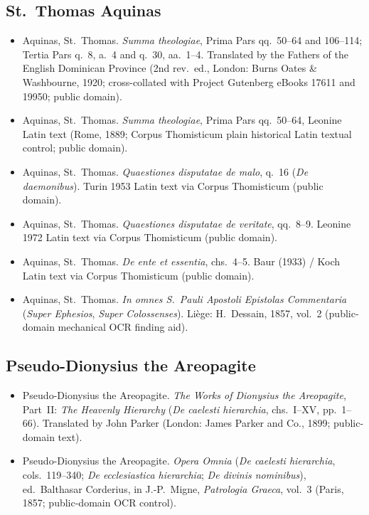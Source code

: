 \subsection{St.~Thomas Aquinas}
\begin{itemize}
\item Aquinas, St.~Thomas. \emph{Summa theologiae}, Prima Pars qq.~50--64 and 106--114; Tertia Pars q.~8, a.~4 and q.~30, aa.~1--4. Translated by the Fathers of the English Dominican Province (2nd rev.\ ed., London: Burns Oates \& Washbourne, 1920; cross-collated with Project Gutenberg eBooks 17611 and 19950; public domain).
\item Aquinas, St.~Thomas. \emph{Summa theologiae}, Prima Pars qq.~50--64, Leonine Latin text (Rome, 1889; Corpus Thomisticum plain historical Latin textual control; public domain).
\item Aquinas, St.~Thomas. \emph{Quaestiones disputatae de malo}, q.~16 (\emph{De daemonibus}). Turin 1953 Latin text via Corpus Thomisticum (public domain).
\item Aquinas, St.~Thomas. \emph{Quaestiones disputatae de veritate}, qq.~8--9. Leonine 1972 Latin text via Corpus Thomisticum (public domain).
\item Aquinas, St.~Thomas. \emph{De ente et essentia}, chs.~4--5. Baur (1933) / Koch Latin text via Corpus Thomisticum (public domain).
\item Aquinas, St.~Thomas. \emph{In omnes S.~Pauli Apostoli Epistolas Commentaria} (\emph{Super Ephesios}, \emph{Super Colossenses}). Li\`ege: H.~Dessain, 1857, vol.~2 (public-domain mechanical OCR finding aid).
\end{itemize}

\subsection{Pseudo-Dionysius the Areopagite}
\begin{itemize}
\item Pseudo-Dionysius the Areopagite. \emph{The Works of Dionysius the Areopagite}, Part~II: \emph{The Heavenly Hierarchy} (\emph{De caelesti hierarchia}, chs.~I--XV, pp.~1--66). Translated by John Parker (London: James Parker and Co., 1899; public-domain text).
\item Pseudo-Dionysius the Areopagite. \emph{Opera Omnia} (\emph{De caelesti hierarchia}, cols.~119--340; \emph{De ecclesiastica hierarchia}; \emph{De divinis nominibus}), ed.\ Balthasar Corderius, in J.-P.~Migne, \emph{Patrologia Graeca}, vol.~3 (Paris, 1857; public-domain OCR control).
\end{itemize}


